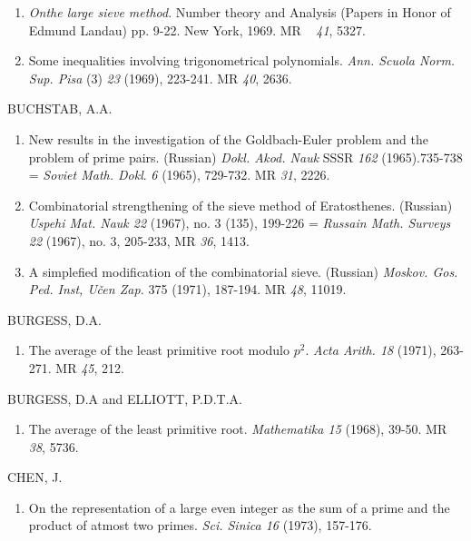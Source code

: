 \begin{thebibliography}{99}
\begin{enumerate}
\item \textit{On\pageoriginale the large sieve method}. Number theory
  and Analysis (Papers in Honor of Edmund Landau) pp. 9-22. New York,
  1969. MR ~ {\em 41}, 5327.

\item Some inequalities involving trigonometrical
  polynomials. \textit{Ann. Scuola Norm. Sup. Pisa} (3) {\em 23} (1969),
  223-241. MR  {\em 40}, 2636. 
 \end{enumerate}
 
 BUCHSTAB, A.A.
\begin{enumerate}
\item New results in the investigation of the Goldbach-Euler problem
  and the problem of prime pairs. (Russian) \textit{Dokl. Akod. Nauk}
    SSSR {\em 162} (1965).735-738 = \textit{Soviet Math. Dokl}. {\em 6}
  (1965), 729-732. MR {\em 31}, 2226. 

\item Combinatorial strengthening of the sieve method of
  Eratosthenes. (Russian) \textit{Uspehi Mat. Nauk 22} (1967),
  no. 3 (135), 199-226 = \textit{Russain Math. Surveys 22} (1967),
  no. 3, 205-233, MR {\em 36}, 1413.  

\item A simplefied modification of the combinatorial sieve. (Russian)
  \textit{Moskov. Gos. Ped. Inst, U\v{c}en Zap.} 375 (1971), 187-194.
  MR {\em 48}, 11019.  
\end{enumerate} 

 BURGESS, D.A.
\begin{enumerate}
\item The average of the least primitive root modulo
  $p^2$. \textit{Acta Arith. 18} (1971), 263-271. MR {\em 45}, 212.
 \end{enumerate}
 
 BURGESS, D.A and ELLIOTT, P.D.T.A.
 \begin{enumerate}
\item The average of the least primitive root. \textit{Mathematika
  15} (1968), 39-50. MR {\em 38}, 5736.  
 \end{enumerate} 
 
 CHEN, J.
 \begin{enumerate}
\item  On the representation of a large even integer as the sum of a
  prime and the product of atmost two primes. \textit{Sci. Sinica
    16} (1973), 157-176.  
 \end{enumerate}


\end{thebibliography}
